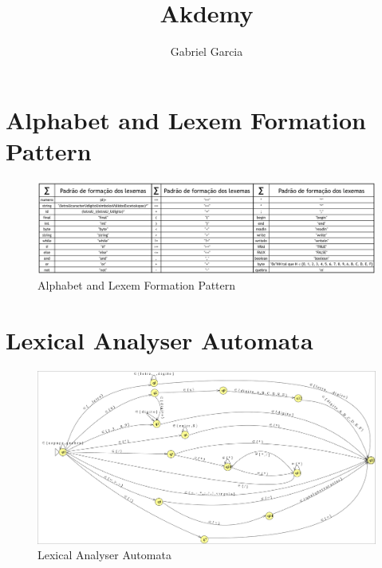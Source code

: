 \documentclass[fleqn]{article}
\title{Akdemy}
\author{Gabriel Garcia}
\begin{document}
	\maketitle
	\newpage
	\section{Alphabet and Lexem Formation Pattern}
		\begin{figure}[ht!]
			\centering
			\includegraphics[scale=.4]{alphabet.png}
			\caption{Alphabet and Lexem Formation Pattern}
		\end{figure}
	\newpage
	\section{Lexical Analyser Automata}
		\begin{figure}[ht!]
			\centering
			\includegraphics[scale=.26]{automata.png}
			\caption{Lexical Analyser Automata}
		\end{figure}
	\newpage
\end{document}
